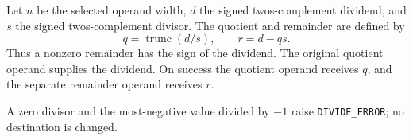 Let \(n\) be the selected operand width, \(d\) the signed two\textquotesingle{}s-complement dividend, and \(s\) the signed two\textquotesingle{}s-complement divisor. The quotient and remainder are defined by
\[
  q = \operatorname{trunc}(d/s),
  \qquad r = d - qs .
\]
Thus a nonzero remainder has the sign of the dividend. The original quotient operand supplies the dividend. On success the quotient operand receives \(q\), and the separate remainder operand receives \(r\).

A zero divisor and the most-negative value divided by \(-1\) raise \texttt{DIVIDE\_ERROR}; no destination is changed.
